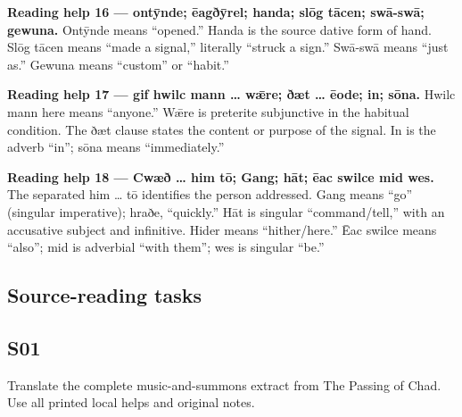 \textbf{Reading help 16 — ontȳnde; ēagðȳrel; handa; slōg tācen; swā-swā; gewuna.} Ontȳnde means “opened.” Handa is the source dative form of hand. Slōg tācen means “made a signal,” literally “struck a sign.” Swā-swā means “just as.” Gewuna means “custom” or “habit.”

\textbf{Reading help 17 — gif hwilc mann … wǣre; ðæt … ēode; in; sōna.} Hwilc mann here means “anyone.” Wǣre is preterite subjunctive in the habitual condition. The ðæt clause states the content or purpose of the signal. In is the adverb “in”; sōna means “immediately.”

\textbf{Reading help 18 — Cwæð … him tō; Gang; hāt; ēac swilce mid wes.} The separated him … tō identifies the person addressed. Gang means “go” (singular imperative); hraðe, “quickly.” Hāt is singular “command/\allowbreak{}tell,” with an accusative subject and infinitive. Hider means “hither/\allowbreak{}here.” Ēac swilce means “also”; mid is adverbial “with them”; wes is singular “be.”

\subsection*{Source-reading tasks}

\par\begin{minipage}{\linewidth}\raggedright
\subsection*{S01}

Translate the complete music-and-summons extract from The Passing of Chad. Use all printed local helps and original notes.

\end{minipage}\par\addvspace{4pt}

